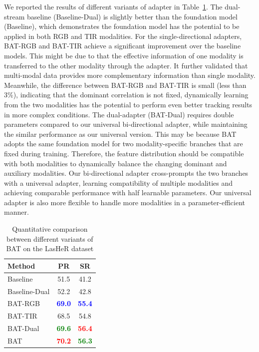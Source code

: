 \documentclass[letterpaper]{article} %
\begin{document}
We reported the results of different variants of adapter in Table~\ref{tab:adaptertype}. 
The dual-stream baseline (Baseline-Dual) is slightly better than the foundation model (Baseline), which demonstrates the foundation model has the potential to be applied in both RGB and TIR modalities.
For the single-directional adapters, BAT-RGB and BAT-TIR achieve a significant improvement over the baseline models. This might be due to that the effective information of one modality is transferred to the other modality through the adapter. It further validated that multi-modal data provides more complementary information than single modality. Meanwhile, the difference between BAT-RGB and BAT-TIR is small (less than 3\%), indicating that the dominant correlation is not fixed, dynamically learning from the two modalities has the potential to perform even better tracking results in more complex conditions.
The dual-adapter (BAT-Dual) requires double parameters compared to our universal bi-directional adapter, while maintaining the similar performance as our universal version. This may be because BAT adopts the same foundation model for two modality-specific branches that are fixed during training. Therefore, the feature distribution should be compatible with both modalities to dynamically balance the changing dominant and auxiliary modalities.
Our bi-directional adapter cross-prompts the two branches with a universal adapter, learning compatibility of multiple modalities and achieving comparable performance with half learnable parameters. Our universal adapter is also more flexible to handle more modalities in a parameter-efficient manner.


\begin{table}[t]
    \centering
    \setlength{\tabcolsep}{12pt}
    \caption{Quantitative comparison between different variants of BAT on the LasHeR dataset}
    \begin{tabular}{lcc}
        \toprule
        Method        & PR& SR  \\
        \midrule
        Baseline     &   51.5  & 41.2\\
        Baseline-Dual    & 52.2   & 42.8   \\
        BAT-RGB & \textbf{\textcolor{blue}{69.0}}  & \textbf{\textcolor{blue}{55.4}}   \\
        BAT-TIR&   68.5 & 54.8 \\
        BAT-Dual & \textbf{\textcolor{green}{69.6}} & \textbf{\textcolor{red}{56.4}}   \\
        \midrule
        BAT          &   \textbf{\textcolor{red}{70.2}} &\textbf{\textcolor{green}{56.3}} \\
        \bottomrule
    \end{tabular}
    \label{tab:adaptertype}
\end{table}
\end{document}
